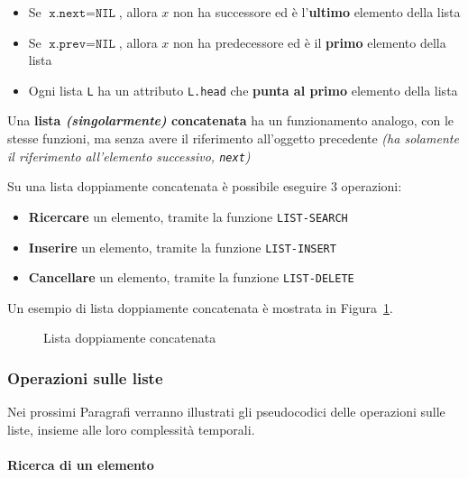 \documentclass[italian, 10pt]{article}
\begin{document}
\begin{itemize}
  \item Se \(\texttt{x.next} = \texttt{NIL}\), allora \(x\) non ha successore ed è l'\textbf{ultimo} elemento della lista
  \item Se \(\texttt{x.prev} = \texttt{NIL}\), allora \(x\) non ha predecessore ed è il \textbf{primo} elemento della lista
  \item Ogni lista \texttt{L} ha un attributo \texttt{L.head} che \textbf{punta al primo} elemento della lista
\end{itemize}

Una \textbf{lista \textit{(singolarmente)} concatenata} ha un funzionamento analogo, con le stesse funzioni, ma senza avere il riferimento all'oggetto precedente \textit{(ha solamente il riferimento all'elemento successivo, \texttt{next})}

\bigskip
Su una lista doppiamente concatenata è possibile eseguire \(3\) operazioni:

\begin{itemize}
  \item \textbf{Ricercare} un elemento, tramite la funzione \texttt{LIST-SEARCH}
  \item \textbf{Inserire} un elemento, tramite la funzione \texttt{LIST-INSERT}
  \item \textbf{Cancellare} un elemento, tramite la funzione \texttt{LIST-DELETE}
\end{itemize}

\bigskip
Un esempio di lista doppiamente concatenata è mostrata in Figura~\ref{fig:lista-doppiamente-concatenata}.

\begin{figure}[htbp]
  \bigskip
  \centering
  \caption{Lista doppiamente concatenata}
  \label{fig:lista-doppiamente-concatenata}
  \bigskip
\end{figure}

\subsubsection{Operazioni sulle liste}

Nei prossimi Paragrafi verranno illustrati gli pseudocodici delle operazioni sulle liste, insieme alle loro complessità temporali.

\paragraph{Ricerca di un elemento}
\end{document}
